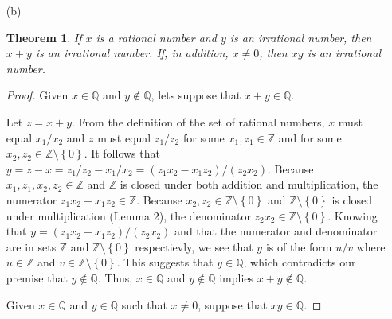 \documentclass[12pt]{article}
\newtheorem*{thm}{Theorem}
\begin{document}
\begin{itemize}
\begin{proof}
The number $xy$ equals $\left(x_1 \cdot y_1\right) / \left(x_2 \cdot y_2\right)$. Because $x_1, y_1 \in \mathbb{Z}$ and $\mathbb{Z}$ is closed under multiplication, the numerator $x_1 \cdot y_1 \in \mathbb{Z}$. Likewise, because $x_2, y_2 \in \mathbb{Z} \setminus \left\{0\right\}$ and $\mathbb{Z} \setminus \left\{0\right\}$ is closed under multiplication (Lemma 2), the denominator $x_2 \cdot y_2 \in \mathbb{Z} \setminus \left\{0\right\}$. Knowing that $x_1 \cdot y_1 \in \mathbb{Z}$ and that $x_2 \cdot y_2 \in \mathbb{Z} \setminus \left\{0\right\}$, we see that $xy$ is of the form $u / v$ where $u \in \mathbb{Z}$ and $v \in \mathbb{Z} \setminus \left\{0\right\}$. Therefore, $xy \in \mathbb{Q}$.
\end{proof}

\item[(b)]
\begin{thm}
If $x$ is a rational number and $y$ is an irrational number, then $x + y$ is an irrational number. If, in addition, $x \neq 0$, then $xy$ is an irrational number.
\end{thm}

\begin{proof}
Given $x \in \mathbb{Q}$ and $y \notin \mathbb{Q}$, lets suppose that $x + y \in \mathbb{Q}$.

Let $z = x + y$. From the definition of the set of rational numbers, $x$ must equal $x_1 / x_2$ and $z$ must equal $z_1 / z_2$ for some $x_1, z_1 \in \mathbb{Z}$ and for some $x_2, z_2 \in \mathbb{Z} \setminus \left\{0\right\}$. It follows that $y = z - x = z_1/z_2 - x_1/x_2 = \left(z_1 x_2 - x_1 z_2\right) / \left(z_2 x_2\right)$. Because $x_1, z_1, x_2, z_2 \in \mathbb{Z}$ and $\mathbb{Z}$ is closed under both addition and multiplication, the numerator $z_1 x_2 - x_1 z_2 \in \mathbb{Z}$. Because $x_2, z_2 \in \mathbb{Z} \setminus \left\{0\right\}$ and $\mathbb{Z} \setminus \left\{0\right\}$ is closed under multiplication (Lemma 2), the denominator $z_2 x_2 \in \mathbb{Z} \setminus \left\{0\right\}$. Knowing that $y = \left(z_1 x_2 - x_1 z_2\right) / \left(z_2 x_2\right)$ and that the numerator and denominator are in sets $\mathbb{Z}$ and $\mathbb{Z} \setminus \left\{0\right\}$ respectievly, we see that $y$ is of the form $u/v$ where $u \in \mathbb{Z}$ and $v \in \mathbb{Z} \setminus \left\{0\right\}$. This suggests that $y \in \mathbb{Q}$, which contradicts our premise that $y \notin \mathbb{Q}$. Thus, $x \in \mathbb{Q}$ and $y \notin \mathbb{Q}$ implies $x + y \notin \mathbb{Q}$.

Given $x \in \mathbb{Q}$ and $y \in \mathbb{Q}$ such that $x \neq 0$, suppose that $xy \in \mathbb{Q}$.


\end{proof}
\end{itemize}
\end{document}
